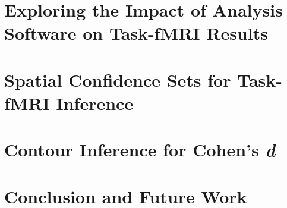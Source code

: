 \documentclass[11pt,a4paper]{report}      %
\begin{document}
\chapter{Exploring the Impact of Analysis Software on Task-fMRI Results}


\chapter{Spatial Confidence Sets for Task-fMRI Inference}


\chapter{Contour Inference for Cohen's \textit{d}}


\chapter{Conclusion and Future Work}
%
%

%  
%  



\end{document}
